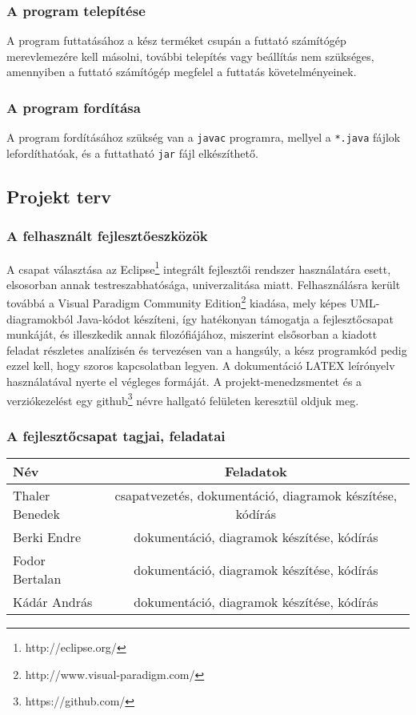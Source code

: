     \subsubsection{A program telepítése}
A program futtatásához a kész terméket csupán a futtató számítógép merevlemezére kell másolni, további telepítés vagy beállítás nem szükséges, amennyiben a futtató számítógép megfelel a futtatás követelményeinek.

    \subsubsection{A program fordítása}
A program fordításához szükség van a \texttt{javac} programra, mellyel a \texttt{*.java} fájlok lefordíthatóak, és a futtatható \texttt{jar} fájl elkészíthető.
    
\subsection{Projekt terv}

    \subsubsection{A felhasznált fejlesztőeszközök}
	A csapat választása az Eclipse\footnote{http://eclipse.org/} integrált fejlesztői rendszer használatára esett, elsosorban annak testreszabhatósága, univerzalitása miatt. Felhasználásra került továbbá a Visual Paradigm Community Edition\footnote{http://www.visual-paradigm.com/} kiadása, mely képes UML-diagramokból Java-kódot készíteni, így hatékonyan támogatja a fejlesztőcsapat munkáját, és illeszkedik annak filozófiájához, miszerint elsősorban a kiadott feladat részletes analízisén és tervezésen van a hangsúly, a kész programkód pedig ezzel kell, hogy szoros kapcsolatban legyen.
A dokumentáció LATEX leírónyelv használatával nyerte el végleges formáját. A projekt-menedzsmentet és a verziókezelést egy github\footnote{https://github.com/} névre hallgató felületen keresztül oldjuk meg.

    \subsubsection{A fejlesztőcsapat tagjai, feladatai}
	\begin{center}
	\begin{tabular} {| l | c | }
		\hline
		Név & Feladatok\\
		\hline
		Thaler Benedek & csapatvezetés, dokumentáció, diagramok készítése, kódírás \\ 
		\hline
		Berki Endre & dokumentáció, diagramok készítése, kódírás \\
		\hline
		Fodor Bertalan & dokumentáció, diagramok készítése, kódírás \\
		\hline
		Kádár András & dokumentáció, diagramok készítése, kódírás \\
		\hline
	\end{tabular}
	\end{center}

